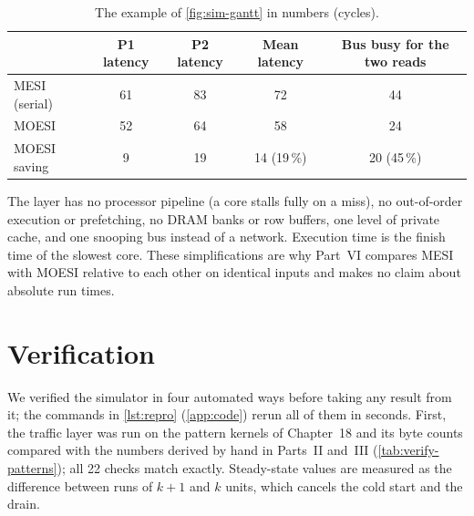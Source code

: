 \begin{table}[htbp]
\centering
\caption{The example of \cref{fig:sim-gantt} in numbers (cycles).}
\label{tab:sim-gantt}
\small
\begin{tabular}{@{}l c c c c@{}}
\toprule
 & P1 latency & P2 latency & Mean latency & Bus busy for the two reads \\
\midrule
MESI (serial) & 61 & 83 & 72 & 44 \\
MOESI & 52 & 64 & 58 & 24 \\
\midrule
MOESI saving & 9 & 19 & 14 (19\,\%) & 20 (45\,\%) \\
\bottomrule
\end{tabular}
\end{table}

The layer has no processor pipeline (a core stalls fully on a miss), no out-of-order
execution or prefetching, no DRAM banks or row buffers, one level of private cache,
and one snooping bus instead of a network. Execution time is the finish time of the
slowest core. These simplifications are why Part~VI compares MESI with MOESI
relative to each other on identical inputs and makes no claim about absolute run
times.

\section{Verification}
\label{sec:sim-verify}
%

We verified the simulator in four automated ways before taking any result from it;
the commands in \cref{lst:repro} (\cref{app:code}) rerun all of them in seconds.
First, the traffic layer was run on the pattern kernels of Chapter~18 and its byte
counts compared with the numbers derived by hand in Parts~II and~III
(\cref{tab:verify-patterns}); all 22 checks match exactly. Steady-state values are
measured as the difference between runs of $k+1$ and $k$ units, which cancels the
cold start and the drain.

